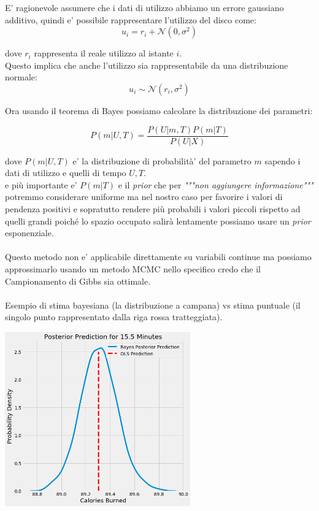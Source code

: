 \documentclass{article}
\begin{document}
E' ragionevole assumere che i dati di utilizzo abbiamo un errore gaussiano additivo, quindi e' possibile rappresentare l'utilizzo del disco come:
\[u_i = r_i + \mathcal{N}(0, \sigma^2)\]

dove \(r_i\) rappresenta il reale utilizzo al istante \(i\).
\\
Questo implica che anche l'utilizzo sia rappresentabile da una distribuzione normale:
\[u_i \sim \mathcal{N}(r_i, \sigma^2)\]

Ora usando il teorema di Bayes possiamo calcolare la distribuzione dei parametri:

\[P(m | U, T) = \frac{P( U | m, T) P(m | T)}{P(U | X)}\]

dove \(P(m | U, T) \) e' la distribuzione di probabilità' del parametro \(m\) sapendo i dati di utilizzo e quelli di tempo \(U, T\).\\

e più importante e' \(P(m | T)\) e il \textit{prior} che per \textit{"""non aggiungere informazione"""} potremmo considerare uniforme ma nel nostro caso per favorire i valori di pendenza positivi e sopratutto rendere più probabili i valori piccoli rispetto ad quelli grandi poiché lo spazio occupato salirà lentamente possiamo usare un \textit{prior} esponenziale.\\\\
Questo metodo non e' applicabile direttamente su variabili continue ma possiamo approssimarlo usando un metodo MCMC nello specifico credo che il Campionamento di Gibbs sia ottimale.
\\\\
Esempio di stima bayesiana (la distribuzione a campana) vs stima puntuale (il singolo punto rappresentato dalla riga rossa tratteggiata).

\begin{center}
    \includegraphics[width=8cm]{BvsF.png}
\end{center}
\end{document}
